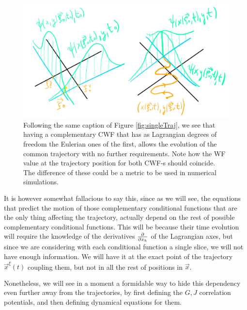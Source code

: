 \documentclass[11pt, a4paper]{article} %
\begin{document}
\begin{figure}[h!]
  \centering
    \includegraphics[width=0.65\linewidth]{bohmian_pair.png}
  \caption{Following the same caption of Figure \ref{fig:singleTraj}, we see that having a complementary CWF that has as Lagrangian degrees of freedom the Eulerian ones of the first, allows the evolution of the common trajectory with no further requirements. Note how the WF value at the trajectory position for both CWF-s should coincide. The difference of these could be a metric to be used in numerical simulations.  }
  \label{fig:pair_bohm}
\end{figure}

It is however somewhat fallacious to say this, since as we will see, the equations that predict the motion of those complementary conditional functions that are the only thing affecting the trajectory, actually depend on the rest of possible complementary conditional functions. This will be because their time evolution will require the knowledge of the derivatives $\pdv{}{x_k}$ of the Lagrangian axes, but since we are considering with each conditional function a single slice, we will not have enough information. We will have it at the exact point of the trajectory $\vec{x}^\xi(t)$ coupling them, but not in all the rest of positions in $\vec{x}$.

Nonetheless, we will see in a moment a formidable way to hide this dependency even further away from the trajectories, by first defining the $G,J$ correlation potentials, and then defining dynamical equations for them.

\newpage
\end{document}
